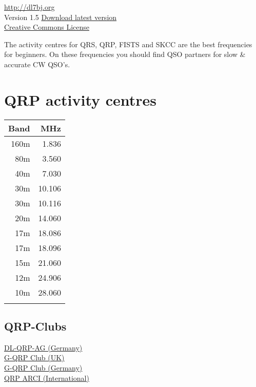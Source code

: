 \documentclass[10pt]{article}
\begin{document}
\begin{multicols}{3}
\vspace{1cm}
\noindent \thedate{} \theauthor{} \href{http://dl7bj.org}{http://dl7bj.org} \\
Version 1.5 \href{http://git.dl7bj.org/Documents}{Download latest version}\\
\ccbyncsa \hspace{0.5cm} \href{http://creativecommons.org/licenses/by-nc-sa/4.0}{Creative Commons License} \\

\newpage

The activity centres for QRS, QRP, FISTS and SKCC are the best frequencies for beginners.
On these frequencies you should find QSO partners for slow \& accurate CW QSO's.

\section{QRP activity centres}
\vspace{\baselineskip}
\begin{tabular}{rr}
Band & MHz\\ \hline 
160m & 1.836\\
 80m & 3.560\\
 40m & 7.030\\
 30m & 10.106\\
 30m & 10.116\\
 20m & 14.060\\
 17m & 18.086\\
 17m & 18.096\\
 15m & 21.060\\
 12m & 24.906\\
 10m & 28.060\\
     &       \\
\end{tabular}

\subsection{QRP-Clubs}
\href{http://www.dl-qrp-ag.de}{DL-QRP-AG (Germany)}\\
\href{http://www.gqrp.com}{G-QRP Club (UK)}\\
\href{http://www.g-qrp-dl.de}{G-QRP Club (Germany)}\\
\href{http://www.qrparci.org}{QRP ARCI (International)}\\


\end{multicols}
\end{document}
